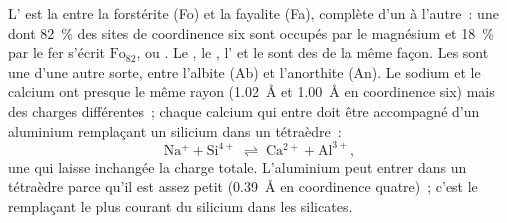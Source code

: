 L' est la  entre la forstérite  (Fo) et la
fayalite  (Fa), complète d'un  à l'autre~: une  dont
\qty{82}{\percent} des sites de coordinence six sont occupés par le magnésium et
\qty{18}{\percent} par le fer s'écrit $\text{Fo}_{82}$, ou
. Le , le , l' et le 
sont des  de la même façon. Les   sont une
 d'une autre sorte, entre l'albite  (Ab) et
l'anorthite  (An). Le sodium et le calcium ont presque le même
rayon (\qty{1.02}{\angstrom} et \qty{1.00}{\angstrom} en coordinence six) mais des
charges différentes~; chaque calcium qui entre doit être accompagné d'un
aluminium remplaçant un silicium dans un tétraèdre~:
\[
  \mathrm{Na^{+}} + \mathrm{Si^{4+}} \;\rightleftharpoons\; \mathrm{Ca^{2+}} + \mathrm{Al^{3+}},
\]
une  qui laisse inchangée la charge totale.
L'aluminium peut entrer dans un tétraèdre parce qu'il est assez petit
(\qty{0.39}{\angstrom} en coordinence quatre)~; c'est le remplaçant le plus
courant du silicium dans les silicates.

